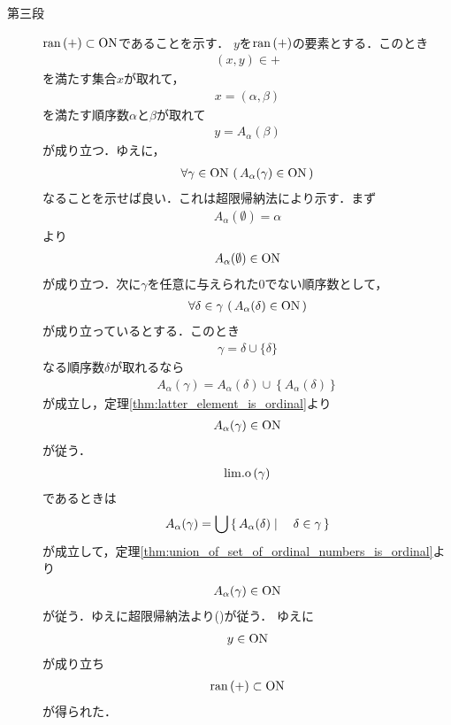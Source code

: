 \begin{sketch}
\begin{description}
			\item[第三段] $\operatorname*{ran} \left(+\right) \subset \mathrm{ON}$であることを示す．
				$y$を$\operatorname*{ran} \left(+\right)$の要素とする．このとき
				\begin{align}
					(x,y) \in +
				\end{align}
				を満たす集合$x$が取れて，
				\begin{align}
					x = (\alpha,\beta)
				\end{align}
				を満たす順序数$\alpha$と$\beta$が取れて
				\begin{align}
					y = A_\alpha(\beta)
				\end{align}
				が成り立つ．ゆえに，
				\begin{align}
					\forall \gamma \in \mathrm{ON}\, \left(\, A_\alpha(\gamma) \in \mathrm{ON}\, \right)
					\label{form:thm_summation_on_ordinal_numbers_is_a_mapping_3}
				\end{align}
				なることを示せば良い．これは超限帰納法により示す．まず
				\begin{align}
					A_\alpha(\emptyset) = \alpha
				\end{align}
				より
				\begin{align}
					A_\alpha(\emptyset) \in \mathrm{ON}
				\end{align}
				が成り立つ．次に$\gamma$を任意に与えられた$0$でない順序数として，
				\begin{align}
					\forall \delta \in \gamma\, \left(\, A_\alpha(\delta) \in \mathrm{ON}\, \right)
				\end{align}
				が成り立っているとする．このとき
				\begin{align}
					\gamma = \delta \cup \{\delta\}
				\end{align}
				なる順序数$\delta$が取れるなら
				\begin{align}
					A_\alpha(\gamma) = A_\alpha(\delta) \cup \left\{A_\alpha(\delta)\right\}
				\end{align}
				が成立し，定理\ref{thm:latter_element_is_ordinal}より
				\begin{align}
					A_\alpha(\gamma) \in \mathrm{ON}
				\end{align}
				が従う．
				\begin{align}
					\mathrm{lim.o}\left(\gamma\right)
				\end{align}
				であるときは
				\begin{align}
					A_\alpha(\gamma) = \bigcup \left\{\, A_\alpha(\delta) \mid \quad \delta \in \gamma\, \right\}
				\end{align}
				が成立して，定理\ref{thm:union_of_set_of_ordinal_numbers_is_ordinal}より
				\begin{align}
					A_\alpha(\gamma) \in \mathrm{ON}
				\end{align}
				が従う．ゆえに超限帰納法より()が従う．
				ゆえに
				\begin{align}
					y \in \mathrm{ON}
				\end{align}
				が成り立ち
				\begin{align}
					\operatorname*{ran} \left(+\right) \subset \mathrm{ON}
				\end{align}
				が得られた．
				

\end{description}
\end{sketch}
